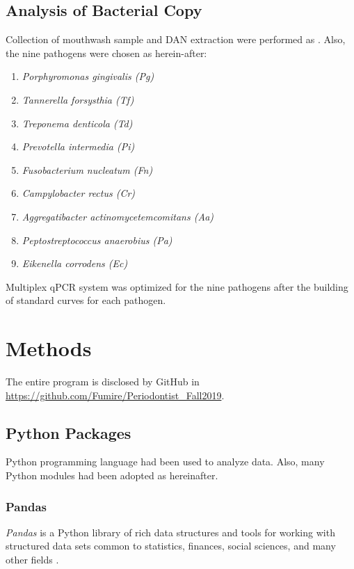 \documentclass[11pt, a4paper]{article}
\begin{document}
	    \subsection{Analysis of Bacterial Copy}
	    	Collection of mouthwash sample and DAN extraction were performed as \cite{ref:DNA1}. Also, the nine pathogens were chosen as herein-after:
	    	\begin{enumerate}
				\item \textit{Porphyromonas gingivalis (Pg)}
				\item \textit{Tannerella forsysthia (Tf)}
				\item \textit{Treponema denticola (Td)}
				\item \textit{Prevotella intermedia (Pi)}
				\item \textit{Fusobacterium nucleatum (Fn)}
				\item \textit{Campylobacter rectus (Cr)}
				\item \textit{Aggregatibacter actinomycetemcomitans (Aa)}
				\item \textit{Peptostreptococcus anaerobius (Pa)}
				\item \textit{Eikenella corrodens (Ec)}
	    	\end{enumerate}
    	
    		Multiplex qPCR system was optimized for the nine pathogens after the building of standard curves for each pathogen. 
    
    \section{Methods}
    	The entire program is disclosed by GitHub in \url{https://github.com/Fumire/Periodontist_Fall2019}. 
    
    	\subsection{Python Packages}
    		Python programming language had been used to analyze data. Also, many Python modules had been adopted as hereinafter.
    		
    		\subsubsection{Pandas}
    		\textit{Pandas} is a Python library of rich data structures and tools for working with structured data sets common to statistics, finances, social sciences, and many other fields \cite{ref:pandas1}.
    		
\end{document}
